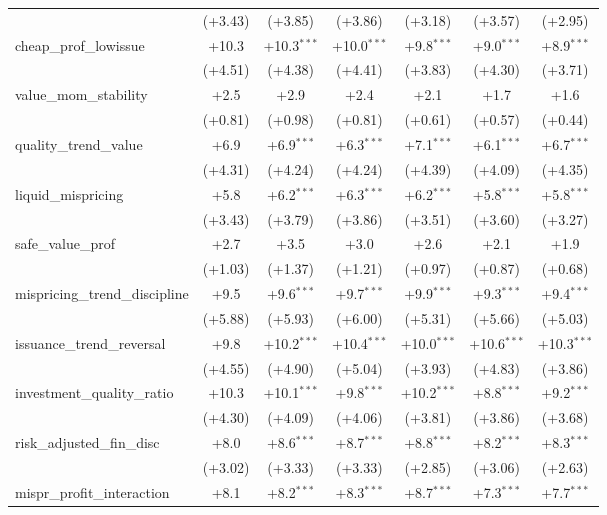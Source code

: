 \begin{table}[htbp]
\begin{threeparttable}
\begin{tabular}{lcccccc}
 & (+3.43) & (+3.85) & (+3.86) & (+3.18) & (+3.57) & (+2.95) \\
\addlinespace
cheap\_prof\_lowissue & +10.3 & +10.3$^{***}$ & +10.0$^{***}$ & +9.8$^{***}$ & +9.0$^{***}$ & +8.9$^{***}$ \\
 & (+4.51) & (+4.38) & (+4.41) & (+3.83) & (+4.30) & (+3.71) \\
\addlinespace
value\_mom\_stability & +2.5 & +2.9 & +2.4 & +2.1 & +1.7 & +1.6 \\
 & (+0.81) & (+0.98) & (+0.81) & (+0.61) & (+0.57) & (+0.44) \\
\addlinespace
quality\_trend\_value & +6.9 & +6.9$^{***}$ & +6.3$^{***}$ & +7.1$^{***}$ & +6.1$^{***}$ & +6.7$^{***}$ \\
 & (+4.31) & (+4.24) & (+4.24) & (+4.39) & (+4.09) & (+4.35) \\
\addlinespace
liquid\_mispricing & +5.8 & +6.2$^{***}$ & +6.3$^{***}$ & +6.2$^{***}$ & +5.8$^{***}$ & +5.8$^{***}$ \\
 & (+3.43) & (+3.79) & (+3.86) & (+3.51) & (+3.60) & (+3.27) \\
\addlinespace
safe\_value\_prof & +2.7 & +3.5 & +3.0 & +2.6 & +2.1 & +1.9 \\
 & (+1.03) & (+1.37) & (+1.21) & (+0.97) & (+0.87) & (+0.68) \\
\addlinespace
mispricing\_trend\_discipline & +9.5 & +9.6$^{***}$ & +9.7$^{***}$ & +9.9$^{***}$ & +9.3$^{***}$ & +9.4$^{***}$ \\
 & (+5.88) & (+5.93) & (+6.00) & (+5.31) & (+5.66) & (+5.03) \\
\addlinespace
issuance\_trend\_reversal & +9.8 & +10.2$^{***}$ & +10.4$^{***}$ & +10.0$^{***}$ & +10.6$^{***}$ & +10.3$^{***}$ \\
 & (+4.55) & (+4.90) & (+5.04) & (+3.93) & (+4.83) & (+3.86) \\
\addlinespace
investment\_quality\_ratio & +10.3 & +10.1$^{***}$ & +9.8$^{***}$ & +10.2$^{***}$ & +8.8$^{***}$ & +9.2$^{***}$ \\
 & (+4.30) & (+4.09) & (+4.06) & (+3.81) & (+3.86) & (+3.68) \\
\addlinespace
risk\_adjusted\_fin\_disc & +8.0 & +8.6$^{***}$ & +8.7$^{***}$ & +8.8$^{***}$ & +8.2$^{***}$ & +8.3$^{***}$ \\
 & (+3.02) & (+3.33) & (+3.33) & (+2.85) & (+3.06) & (+2.63) \\
\addlinespace
mispr\_profit\_interaction & +8.1 & +8.2$^{***}$ & +8.3$^{***}$ & +8.7$^{***}$ & +7.3$^{***}$ & +7.7$^{***}$ \\

\end{tabular}
\end{threeparttable}
\end{table}
